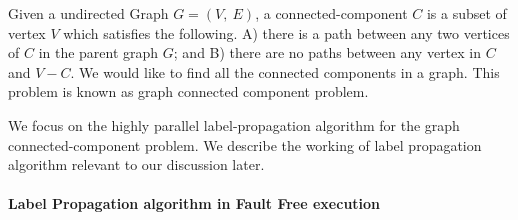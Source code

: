 
Given a undirected Graph $G=(V,\ E)$, a connected-component $C$ is a subset of
vertex $V$ which satisfies the following.  A) there is a path between any two
vertices of $C$ in the parent graph $G$;  and B) there are no paths between
any vertex in $C$ and $V-C$. We would like to find all the connected
components in a graph. This problem is known as graph connected component
problem.

 We focus on the highly parallel label-propagation algorithm for the graph
connected-component problem.  We describe the working of label propagation
algorithm relevant to our discussion later. \paragraph{Label Propagation
algorithm in Fault Free execution}

